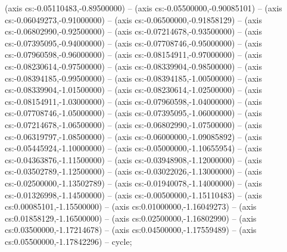 (axis cs:-0.05110483,-0.89500000) -- (axis cs:-0.05500000,-0.90085101) -- (axis cs:-0.06049273,-0.91000000) -- (axis cs:-0.06500000,-0.91858129) -- (axis cs:-0.06802990,-0.92500000) -- (axis cs:-0.07214678,-0.93500000) -- (axis cs:-0.07395095,-0.94000000) -- (axis cs:-0.07708746,-0.95000000) -- (axis cs:-0.07960598,-0.96000000) -- (axis cs:-0.08154911,-0.97000000) -- (axis cs:-0.08230614,-0.97500000) -- (axis cs:-0.08339904,-0.98500000) -- (axis cs:-0.08394185,-0.99500000) -- (axis cs:-0.08394185,-1.00500000) -- (axis cs:-0.08339904,-1.01500000) -- (axis cs:-0.08230614,-1.02500000) -- (axis cs:-0.08154911,-1.03000000) -- (axis cs:-0.07960598,-1.04000000) -- (axis cs:-0.07708746,-1.05000000) -- (axis cs:-0.07395095,-1.06000000) -- (axis cs:-0.07214678,-1.06500000) -- (axis cs:-0.06802990,-1.07500000) -- (axis cs:-0.06319797,-1.08500000) -- (axis cs:-0.06000000,-1.09085892) -- (axis cs:-0.05445924,-1.10000000) -- (axis cs:-0.05000000,-1.10655954) -- (axis cs:-0.04363876,-1.11500000) -- (axis cs:-0.03948908,-1.12000000) -- (axis cs:-0.03502789,-1.12500000) -- (axis cs:-0.03022026,-1.13000000) -- (axis cs:-0.02500000,-1.13502789) -- (axis cs:-0.01940078,-1.14000000) -- (axis cs:-0.01326998,-1.14500000) -- (axis cs:-0.00500000,-1.15110483) -- (axis cs:0.00085101,-1.15500000) -- (axis cs:0.01000000,-1.16049273) -- (axis cs:0.01858129,-1.16500000) -- (axis cs:0.02500000,-1.16802990) -- (axis cs:0.03500000,-1.17214678) -- (axis cs:0.04500000,-1.17559489) -- (axis cs:0.05500000,-1.17842296) -- cycle;
